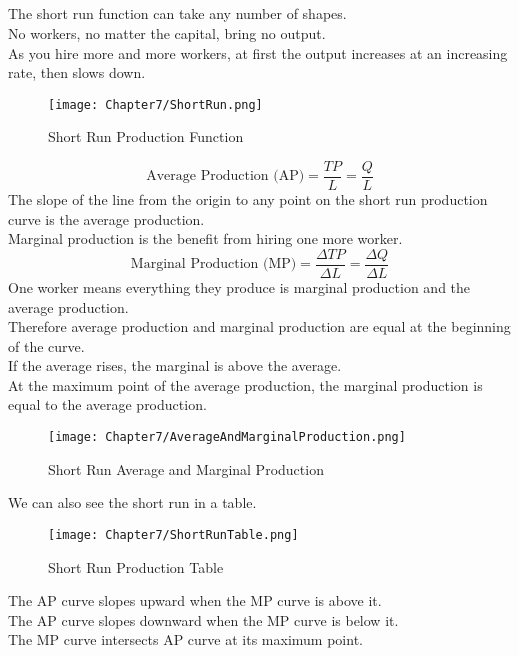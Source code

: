 \subsection{}
The short run function can take any number of shapes.\\
No workers, no matter the capital, bring no output.\\
As you hire more and more workers, at first the output increases at an increasing rate, then slows down.
\begin{figure}[H]
    \centering
    \texttt{[image: Chapter7/ShortRun.png]}
    \caption{Short Run Production Function}
\end{figure}
\begin{equation}
    \text{Average Production (AP)}= \frac{TP}{L} = \frac{Q}{L}
\end{equation}
The slope of the line from the origin to any point on the short run production curve is the average production.\\
Marginal production is the benefit from hiring one more worker.
\begin{equation}
    \text{Marginal Production (MP)} = \frac{\Delta TP}{\Delta L} = \frac{\Delta Q}{\Delta L}
\end{equation}
One worker means everything they produce is marginal production and the average production.\\
Therefore average production and marginal production are equal at the beginning of the curve.\\
If the average rises, the marginal is above the average.\\
At the maximum point of the average production, the marginal production is equal to the average production.
\begin{figure}[H]
    \centering
    \texttt{[image: Chapter7/AverageAndMarginalProduction.png]}
    \caption{Short Run Average and Marginal Production}
\end{figure}
We can also see the short run in a table.
\begin{figure}[H]
    \centering
    \texttt{[image: Chapter7/ShortRunTable.png]}
    \caption{Short Run Production Table}
\end{figure}
The AP curve slopes upward when the MP curve is above it.\\
The AP curve slopes downward when the MP curve is below it.\\
The MP curve intersects AP curve at its maximum point.